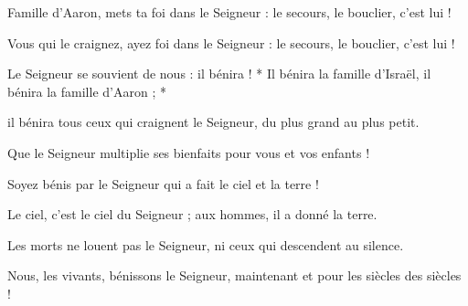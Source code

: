 \item Famille d'Aaron, mets ta foi dans le Seigneur : le secours, le bouclier, c'est lui !

\item Vous qui le craignez, ayez foi dans le Seigneur : le secours, le bouclier, c'est lui !

\item Le Seigneur se souvient de nous : il bénira ! * Il bénira la famille d'Israël, il bénira la famille d'Aaron ; *

\item il bénira tous ceux qui craignent le Seigneur, du plus grand au plus petit.

\item Que le Seigneur multiplie ses bienfaits pour vous et vos enfants !

\item Soyez bénis par le Seigneur qui a fait le ciel et la terre !

\item Le ciel, c'est le ciel du Seigneur ; aux hommes, il a donné la terre.

\item Les morts ne louent pas le Seigneur, ni ceux qui descendent au silence.

\item Nous, les vivants, bénissons le Seigneur, maintenant et pour les siècles des siècles !